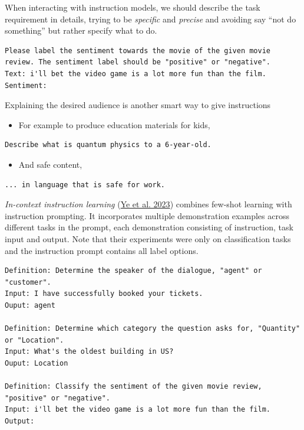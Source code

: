 When interacting with instruction models, we should describe the task requirement in details, trying to be \emph{specific} and \emph{precise} and avoiding say ``not do something'' but rather specify what to do.

\begin{verbatim}
Please label the sentiment towards the movie of the given movie review. The sentiment label should be "positive" or "negative". 
Text: i'll bet the video game is a lot more fun than the film. 
Sentiment:
\end{verbatim}

Explaining the desired audience is another smart way to give instructions

\begin{itemize}
\tightlist
\item
  For example to produce education materials for kids,
\end{itemize}

\begin{verbatim}
Describe what is quantum physics to a 6-year-old.
\end{verbatim}

\begin{itemize}
\tightlist
\item
  And safe content,
\end{itemize}

\begin{verbatim}
... in language that is safe for work.
\end{verbatim}

\emph{In-context instruction learning} (\href{https://arxiv.org/abs/2302.14691}{Ye et al. 2023}) combines few-shot learning with instruction prompting. It incorporates multiple demonstration examples across different tasks in the prompt, each demonstration consisting of instruction, task input and output. Note that their experiments were only on classification tasks and the instruction prompt contains all label options.

\begin{verbatim}
Definition: Determine the speaker of the dialogue, "agent" or "customer".
Input: I have successfully booked your tickets.
Ouput: agent

Definition: Determine which category the question asks for, "Quantity" or "Location".
Input: What's the oldest building in US?
Ouput: Location

Definition: Classify the sentiment of the given movie review, "positive" or "negative".
Input: i'll bet the video game is a lot more fun than the film.
Output:
\end{verbatim}

